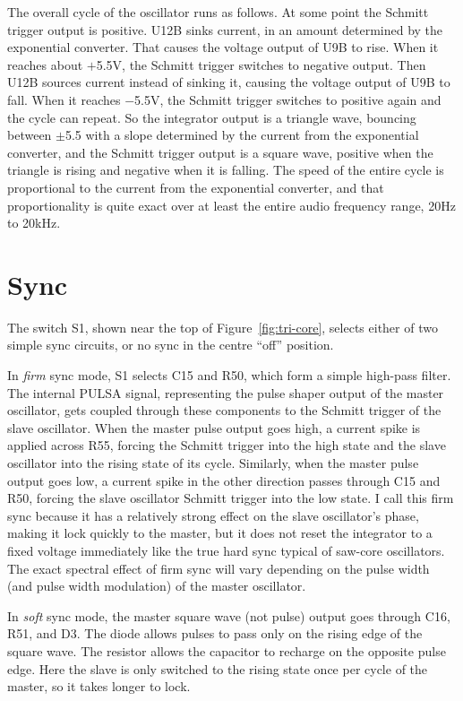The overall cycle of the oscillator runs as follows.  At some point the
Schmitt trigger output is positive.  U12B sinks current, in an amount
determined by the exponential converter.  That causes the voltage output of
U9B to rise.  When it reaches about $+$5.5V, the Schmitt trigger switches to
negative output.  Then U12B sources current instead of sinking it, causing
the voltage output of U9B to fall.  When it reaches $-$5.5V, the Schmitt
trigger switches to positive again and the cycle can repeat.  So the
integrator output is a triangle wave, bouncing between $\pm$5.5 with a slope
determined by the current from the exponential converter, and the Schmitt
trigger output is a square wave, positive when the triangle is rising and
negative when it is falling.  The speed of the entire cycle is proportional
to the current from the exponential converter, and that proportionality is
quite exact over at least the entire audio frequency range, 20Hz to 20kHz.


\section{Sync}

The switch S1, shown near the top of Figure~\ref{fig:tri-core}, selects
either of two simple sync circuits, or no sync in the centre ``off''
position.

In \emph{firm} sync mode, S1 selects C15 and R50, which form a simple
high-pass filter.  The internal PULSA signal, representing the pulse shaper
output of the master oscillator, gets coupled through these components to
the Schmitt trigger of the slave oscillator.  When the master pulse output
goes high, a current spike is applied across R55, forcing the Schmitt
trigger into the high state and the slave oscillator into the rising state
of its cycle.  Similarly, when the master pulse output goes low, a current
spike in the other direction passes through C15 and R50, forcing the slave
oscillator Schmitt trigger into the low state.  I call this firm sync
because it has a relatively strong effect on the slave oscillator's phase,
making it lock quickly to the master, but it does not reset the integrator
to a fixed voltage immediately like the true hard sync typical of saw-core
oscillators.  The exact spectral effect of firm sync will vary depending on
the pulse width (and pulse width modulation) of the master oscillator.

In \emph{soft} sync mode, the master square wave (not pulse) output goes
through C16, R51, and D3.  The diode allows pulses to pass only on the
rising edge of the square wave.  The resistor allows the capacitor to
recharge on the opposite pulse edge.  Here the slave is only switched to
the rising state once per cycle of the master, so it takes longer to lock.

